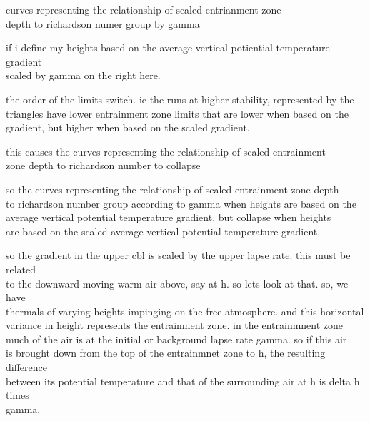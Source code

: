 \documentclass{beamer}
\newcommand\FrameText[1]{
\begin{textblock}{16}(1,2.5)
\raggedright #1
\end{textblock}}
\begin{document}
\begin{frame}
curves representing the relationship of scaled entrianment zone\\
depth to richardson numer group by gamma
\end{frame}

\begin{frame}
if i define my heights based on the average vertical potiential temperature gradient\\
scaled by gamma on the right here.\\
\end{frame}

\begin{frame}
the order of the limits switch.  ie the runs at higher stability, represented by the\\
triangles have lower entrainment zone limits that are lower when based on the \\
gradient, but higher when based on the scaled gradient.
\end{frame}

\begin{frame}
this causes the curves representing the relationship of scaled entrainment\\
zone depth to richardson number to collapse\\
\end{frame}

\begin{frame}
so the curves representing the relationship of scaled entrainment zone depth\\
to richardson number group according to gamma when heights are based on the\\
average vertical potential temperature gradient, but collapse when heights\\
are based on the scaled average vertical potential temperature gradient.
\end{frame}


\begin{frame}
so the gradient in the upper cbl is scaled by the upper lapse rate.  this must be related\\
to the downward moving warm air above, say at h.  so lets look at that.  so, we have\\
thermals of varying heights impinging on the free atmosphere.  and this horizontal\\
variance in height represents the entrainment zone.  in the entrainmnent zone\\
much of the air is at the initial or background lapse rate gamma.  so if this air\\
is brought down from the top of the entrainmnet zone to h, the resulting difference\\
between its potential temperature and that of the surrounding air at h is delta h times\\
gamma. 
\end{frame}
\end{document}
